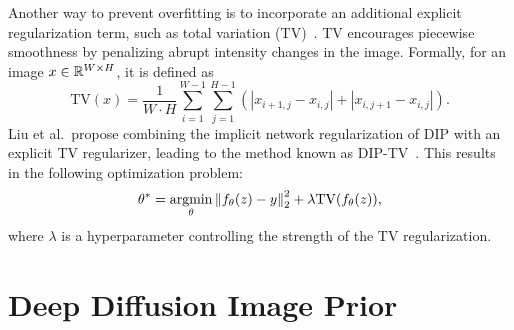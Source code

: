 Another way to prevent overfitting is to incorporate an additional explicit regularization term, such as total variation (TV)~\cite{TV}.
TV encourages piecewise smoothness by penalizing abrupt intensity changes in the image.
Formally, for an image $x \in \mathbb{R}^{W \times H}$, it is defined as
\begin{equation}
    \text{TV}(x) = \frac{1}{W \cdot H} \sum_{i=1}^{W-1} \sum_{j=1}^{H-1} (|x_{i+1,j} - x_{i,j}| + |x_{i,j+1} - x_{i,j}|).
\end{equation}
Liu et al.\ propose combining the implicit network regularization of DIP with an explicit TV regularizer, leading to the method known as DIP-TV~\cite{DIP-TV}.
This results in the following optimization problem:
\begin{equation}
    \theta^* = \operatorname*{argmin}_\theta \left\lVert f_\theta(z) - y\right\rVert_2^2 + \lambda \text{TV}(f_\theta(z)),
\end{equation}
where $\lambda$ is a hyperparameter controlling the strength of the TV regularization.

\section{Deep Diffusion Image Prior}


